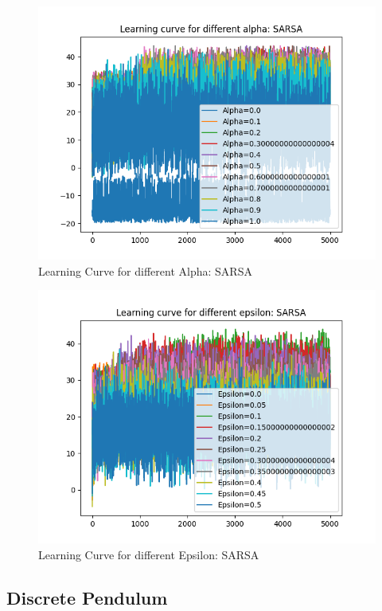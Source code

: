 \documentclass[conf]{new-aiaa}
\begin{document}
\begin{figure}[H]
\centering
\includegraphics[width=30pc]{figs/gw/alpha_sweep_SARSA.png}
\caption{Learning Curve for different Alpha: SARSA}
\label{fig_env1}
\end{figure}

\begin{figure}[H]
\centering
\includegraphics[width=30pc]{figs/gw/epsilon_sweep_SARSA.png}
\caption{Learning Curve for different Epsilon: SARSA}
\label{fig_env1}
\end{figure}





\newpage
\subsection{Discrete Pendulum}
\end{document}
